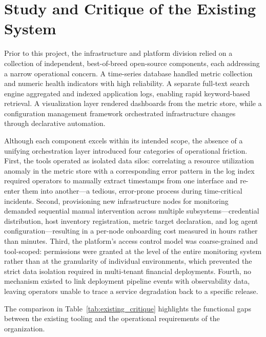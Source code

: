 \documentclass[12pt,a4paper]{report}
\begin{document}
\section{Study and Critique of the Existing System}

Prior to this project, the infrastructure and platform division relied on a collection of independent, best-of-breed open-source components, each addressing a narrow operational concern. A time-series database handled metric collection and numeric health indicators with high reliability. A separate full-text search engine aggregated and indexed application logs, enabling rapid keyword-based retrieval. A visualization layer rendered dashboards from the metric store, while a configuration management framework orchestrated infrastructure changes through declarative automation.

Although each component excels within its intended scope, the absence of a unifying orchestration layer introduced four categories of operational friction. First, the tools operated as isolated data silos: correlating a resource utilization anomaly in the metric store with a corresponding error pattern in the log index required operators to manually extract timestamps from one interface and re-enter them into another—a tedious, error-prone process during time-critical incidents. Second, provisioning new infrastructure nodes for monitoring demanded sequential manual intervention across multiple subsystems—credential distribution, host inventory registration, metric target declaration, and log agent configuration—resulting in a per-node onboarding cost measured in hours rather than minutes. Third, the platform's access control model was coarse-grained and tool-scoped: permissions were granted at the level of the entire monitoring system rather than at the granularity of individual environments, which prevented the strict data isolation required in multi-tenant financial deployments. Fourth, no mechanism existed to link deployment pipeline events with observability data, leaving operators unable to trace a service degradation back to a specific release.

The comparison in Table~\ref{tab:existing_critique} highlights the functional gaps between the existing tooling and the operational requirements of the organization.
\end{document}
